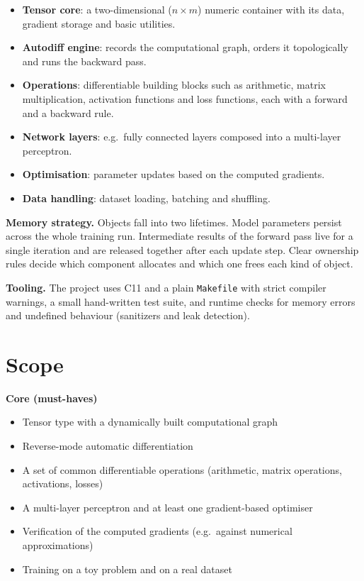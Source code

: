 \documentclass[11pt,a4paper]{article}
\newcommand{\code}[1]{\texttt{#1}}
\begin{document}
\begin{itemize}
  \item \textbf{Tensor core}: a two-dimensional ($n \times m$) numeric container with its data,
    gradient storage and basic utilities.
  \item \textbf{Autodiff engine}: records the computational graph, orders it
    topologically and runs the backward pass.
  \item \textbf{Operations}: differentiable building blocks such as arithmetic,
    matrix multiplication, activation functions and loss functions, each with
    a forward and a backward rule.
  \item \textbf{Network layers}: e.g.\ fully connected layers composed into a
    multi-layer perceptron.
  \item \textbf{Optimisation}: parameter updates based on the computed
    gradients.
  \item \textbf{Data handling}: dataset loading, batching and shuffling.
\end{itemize}

\textbf{Memory strategy.} Objects fall into two lifetimes. Model parameters
persist across the whole training run. Intermediate results of the forward pass
live for a single iteration and are released together after each update step.
Clear ownership rules decide which component allocates and which one frees each
kind of object.

\textbf{Tooling.} The project uses C11 and a plain \code{Makefile} with strict
compiler warnings, a small hand-written test suite, and runtime checks for
memory errors and undefined behaviour (sanitizers and leak detection).

\section{Scope}

\textbf{Core (must-haves)}
\begin{itemize}
  \item Tensor type with a dynamically built computational graph
  \item Reverse-mode automatic differentiation
  \item A set of common differentiable operations (arithmetic, matrix
    operations, activations, losses)
  \item A multi-layer perceptron and at least one gradient-based optimiser
  \item Verification of the computed gradients (e.g.\ against numerical
    approximations)
  \item Training on a toy problem and on a real dataset
\end{itemize}
\end{document}
